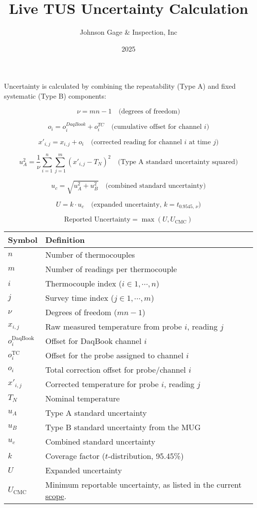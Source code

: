 \documentclass{article}
\title{Live TUS Uncertainty Calculation}
\author{Johnson Gage \& Inspection, Inc}
\date{2025}
\begin{document}
\maketitle

Uncertainty is calculated by combining the repeatability (Type A) and fixed systematic (Type B) components:

\[
\nu = m n - 1
\quad \text{(degrees of freedom)}
\]

\[
o_i = o^{DaqBook}_i + o^{TC}_i
\quad\text{(cumulative offset for channel $i$)}
\]

\[
x'_{i,j} = x_{i,j} + o_i
\quad\text{(corrected reading for channel $i$ at time $j$)}
\]

\[
u_A^2 = \frac{1}{\nu} \sum_{i=1}^{n} \sum_{j=1}^{m} (x'_{i,j} - T_N)^2
\quad \text{(Type A standard uncertainty squared)}
\]

\[
u_c = \sqrt{u_A^2 + u_B^2}
\quad \text{(combined standard uncertainty)}
\]

\[
U = k \cdot u_c
\quad \text{(expanded uncertainty, } k = t_{0.9545,\, \nu} \text{)}
\]

\[
\boxed{\text{Reported Uncertainty} = \max\left(U, U_{\mathrm{CMC}}\right)}
\]

\vspace{1em}
\begin{tabular}{@{}ll@{}}
\toprule
Symbol & Definition \\
\midrule
\( n \)     & Number of thermocouples \\
\( m \)     & Number of readings per thermocouple \\
\( i \)     & Thermocouple index ($i \in 1,\cdots,n$) \\
\( j \)     & Survey time index ($j \in 1,\cdots,m$) \\
\( \nu \)   & Degrees of freedom ($mn - 1$) \\
\( x_{i,j} \) & Raw measured temperature from probe $i$, reading $j$ \\
\( o^{\mathrm{DaqBook}}_i \) & Offset for DaqBook channel \( i \) \\
\( o^{\mathrm{TC}}_i \) & Offset for the probe assigned to channel \( i \) \\
\( o_i \)   & Total correction offset for probe/channel \( i \) \\
\( x'_{i,j} \) & Corrected temperature for probe \( i \), reading \( j \) \\
\( T_N \) & Nominal temperature \\
\( u_A \)   & Type A standard uncertainty \\
\( u_B \)   & Type B standard uncertainty from the MUG \\
\( u_c \)   & Combined standard uncertainty \\
\( k \)     & Coverage factor (\( t \)-distribution, 95.45\%) \\
\( U \)     & Expanded uncertainty \\
$U_{\mathrm{CMC}}$ & Minimum reportable uncertainty, as listed in the current \href{https://customer.a2la.org/index.cfm?event=directory.detail&labPID=46ECE43E-423E-465E-8FBB-36DC011ED988}{scope}.\\
\bottomrule
\end{tabular}
\end{document}
